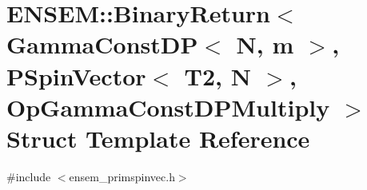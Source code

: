 \hypertarget{structENSEM_1_1BinaryReturn_3_01GammaConstDP_3_01N_00_01m_01_4_00_01PSpinVector_3_01T2_00_01N_01c511155a335117739782ed7ccba11d26}{}\section{E\+N\+S\+EM\+:\+:Binary\+Return$<$ Gamma\+Const\+DP$<$ N, m $>$, P\+Spin\+Vector$<$ T2, N $>$, Op\+Gamma\+Const\+D\+P\+Multiply $>$ Struct Template Reference}
\label{structENSEM_1_1BinaryReturn_3_01GammaConstDP_3_01N_00_01m_01_4_00_01PSpinVector_3_01T2_00_01N_01c511155a335117739782ed7ccba11d26}


{\ttfamily \#include $<$ensem\+\_\+primspinvec.\+h$>$}

